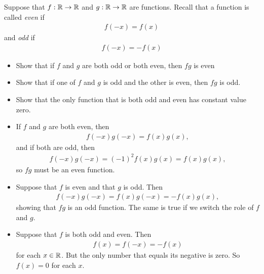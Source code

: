 \documentclass[11pt]{article}
\begin{document}
\begin{exercise}
    Suppose that $f : \mathbb{R} \rightarrow \mathbb{R}$ and $g : \mathbb{R} \rightarrow \mathbb{R}$ are functions. 
    Recall that a function is called \textit{even} if 
    \begin{align*}
        f(-x) = f(x)
    \end{align*}
    and \textit{odd} if 
    \begin{align*}
        f(-x) = - f(x)
    \end{align*}
    \begin{itemize}
     \item Show that if $f$ and $g$ are both odd or both even, then $fg$ is even 
     \item Show that if one of $f$ and $g$ is odd and the other is even, then $fg$ is odd.
     \item Show that the only function that is both odd and even has constant value zero. 
    \end{itemize}
\end{exercise}
\begin{solution}
    \begin{itemize}
     \item If $f$ and $g$ are both even, then 
     \begin{align*}
        f(-x)g(-x) = f(x)g(x),
     \end{align*}
     and if both are odd, then 
     \begin{align*}
        f(-x)g(-x) = (-1)^{2} f(x)g(x) = f(x) g(x),
     \end{align*}
     so $fg$ must be an even function.
     \item 
     Suppose that $f$ is even and that $g$ is odd. Then 
     \begin{align*}
        f(-x) g(-x) = f(x) g(-x) = - f(x)g(x),
     \end{align*}
     showing that $fg$ is an odd function. The same is true if we switch the role of $f$ and $g$.
     \item 
     Suppose that $f$ is both odd and even. Then 
     \begin{align*}
        f(x) = f(-x) = -f(x)
     \end{align*}
     for each $x \in \mathbb{R}$. But the only number that equals its negative is zero. So $f(x) = 0$ for each $x$.
    \end{itemize}
\end{solution}
\end{document}
